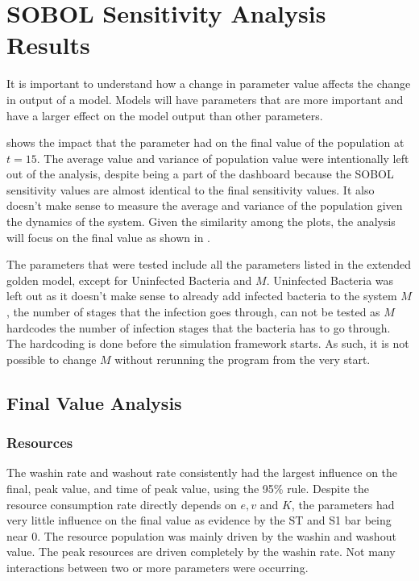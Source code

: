 \section{SOBOL Sensitivity Analysis Results}
\label{sec:SOBOL_sensitivity_analysis_results}
It is important to understand how a change in parameter value affects the change in output of a model. 
Models will have parameters that are more important and have a larger effect on the model output than other parameters. 

 shows the impact that the parameter had on the final value of the population at $t=15$. 
The average value and variance of population value were intentionally left out of the analysis, despite being a part of the dashboard because the SOBOL sensitivity values are almost identical to the final sensitivity values. 
It also doesn't make sense to measure the average and variance of the population given the dynamics of the system. 
Given the similarity among the plots, the analysis will focus on the final value as shown in .

The parameters that were tested include all the parameters listed in the extended golden model, except for Uninfected Bacteria and $M$. 
Uninfected Bacteria was left out as it doesn't make sense to already add infected bacteria to the system
$M$, the number of stages that the infection goes through, can not be tested as $M$ hardcodes the number of infection stages that the bacteria has to go through. 
The hardcoding is done before the simulation framework starts. 
As such, it is not possible to change $M$ without rerunning the program from the very start. 

\subsection{Final Value Analysis}
\subsubsection{Resources}
The washin rate and washout rate consistently had the largest influence on the final, peak value, and time of peak value, using the 95\% rule. 
Despite the resource consumption rate directly depends on $e, v$ and $K$, the parameters had very little influence on the final value as evidence by the ST and S1 bar being near 0. 
The resource population was mainly driven by the washin and washout value. 
The peak resources are driven completely by the washin rate. 
Not many interactions between two or more parameters were occurring. 

